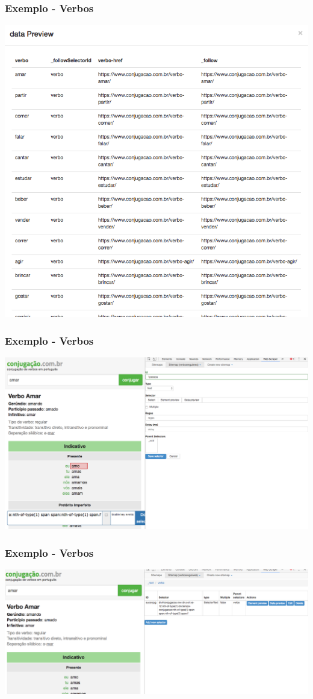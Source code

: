 \documentclass{beamer}
\begin{document}
\begin{frame}
\frametitle{Exemplo - Verbos}
\includegraphics[width=\textwidth]{Screen_Shot_2017-10-05_at_22_49_47.png}
\end{frame}

\begin{frame}
\frametitle{Exemplo - Verbos}
\includegraphics[width=\textwidth]{Screen_Shot_2017-10-05_at_22_27_52.png}
\end{frame}

\begin{frame}
\frametitle{Exemplo - Verbos}
\includegraphics[width=\textwidth]{Screen_Shot_2017-10-05_at_22_42_33.png}
\end{frame}
\end{document}
